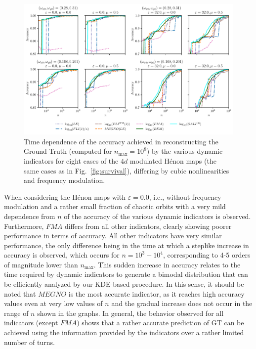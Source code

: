 \begin{figure}[htp]
    \centering
    \includegraphics[width=1.0\textwidth]{6_dynamic_indicators/figs/performance.pdf}
    \caption{Time dependence of the accuracy achieved in reconstructing the Ground Truth (computed for $n_\text{max}=10^8$) by the various dynamic indicators for eight cases of the $4d$ modulated Hénon maps (the same cases as in Fig.~\ref{fig:survival}), differing by cubic nonlinearities and frequency modulation.}
    \label{fig:performance}
\end{figure}

When considering the Hénon maps with $\varepsilon=0.0$, i.e., without frequency modulation and a rather small fraction of chaotic orbits with a very mild dependence from $n$ of the accuracy of the various dynamic indicators is observed. Furthermore, $FMA$ differs from all other indicators, clearly showing poorer performance in terms of accuracy. All other indicators have very similar performance, the only difference being in the time at which a steplike increase in accuracy is observed, which occurs for $n = 10^3 - 10^4$, corresponding to 4-5 orders of magnitude lower than $n_\text{max}$. This sudden increase in accuracy relates to the time required by dynamic indicators to generate a bimodal distribution that can be efficiently analyzed by our KDE-based procedure. In this sense, it should be noted that $MEGNO$ is the most accurate indicator, as it reaches high accuracy values even at very low values of $n$ and the gradual increase does not occur in the range of $n$ shown in the graphs. In general, the behavior observed for all indicators (except $FMA$) shows that a rather accurate prediction of GT can be achieved using the information provided by the indicators over a rather limited number of turns.

